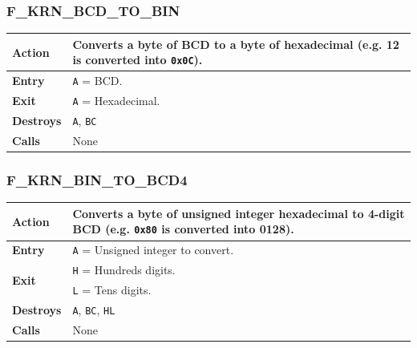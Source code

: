 \documentclass[a4paper,11pt]{article}
\begin{document}
        \subsubsection{F\_KRN\_BCD\_TO\_BIN}
        \label{func:fkrnbcdtobin}
        \begin{tabular}{l p{9cm}}
            \hline\textbf{Action}
            & Converts a byte of BCD to a byte of hexadecimal
            (e.g. 12 is converted into \texttt{0x0C}).\\
            \hline\textbf{Entry} & \texttt{A} = BCD.\\
            \hline\textbf{Exit} & \texttt{A} = Hexadecimal.\\
            \hline\textbf{Destroys} & \texttt{A}, \texttt{BC}\\
            \hline\textbf{Calls} & None\\
            \hline
        \end{tabular}

        \subsubsection{F\_KRN\_BIN\_TO\_BCD4}
        \label{func:fkrnbintobcd4}
        \begin{tabular}{l p{9cm}}
            \hline\textbf{Action}
            & Converts a byte of unsigned integer hexadecimal to 4-digit BCD
            (e.g. \texttt{0x80} is converted into 0128).\\
            \hline\textbf{Entry} & \texttt{A} = Unsigned integer to convert.\\
            \hline\multirow[t]{2}{4em}{\textbf{Exit}}
            & \texttt{H} = Hundreds digits.\\
            & \texttt{L} = Tens digits.\\
            \hline\textbf{Destroys} & \texttt{A}, \texttt{BC}, \texttt{HL}\\
            \hline\textbf{Calls} & None\\
            \hline
        \end{tabular}

\end{document}
